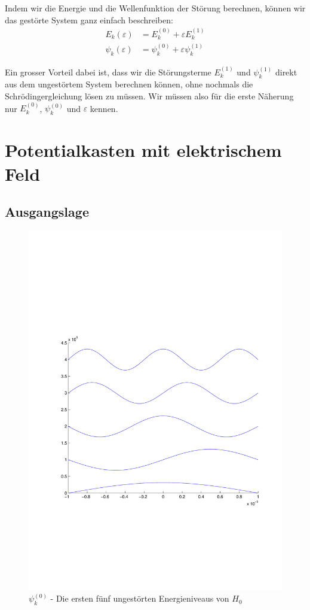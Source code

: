 \begin{refsection}
Indem wir die Energie und die Wellenfunktion der St\"orung berechnen, k\"onnen wir das gest\"orte System ganz einfach beschreiben:
\begin{equation}
\begin{aligned}
E_k(\varepsilon)&=E_k^{(0)} + \varepsilon E_k^{(1)}
\\
\psi_k(\varepsilon)&=\psi_k^{(0)} + \varepsilon \psi_k^{(1)}
\end{aligned}
\end{equation}

Ein grosser Vorteil dabei ist,
dass wir die St\"orungsterme $E_k^{(1)}$ und $\psi_k^{(1)}$
direkt aus dem ungest\"ortem System berechnen k\"onnen,
ohne nochmals die Schr\"odingergleichung l\"osen zu m\"ussen.
Wir m\"ussen also f\"ur die erste N\"aherung nur $E_k^{(0)}$,
$\psi_k^{(0)}$ und $\varepsilon$ kennen.




\section{Potentialkasten mit elektrischem Feld}

\subsection{Ausgangslage}

\begin{figure}
 \centering
 \includegraphics[width=12cm,clip=true,trim=2cm 7cm 1cm 8cm]{efeld/Psi_ungestoert.pdf}
 \caption{$\psi_k^{(0)}$ - Die ersten f\"unf ungest\"orten Energieniveaus von $H_0$ }
 \label{abb:efeld_psi_ungestoert}
\end{figure}


\end{refsection}
